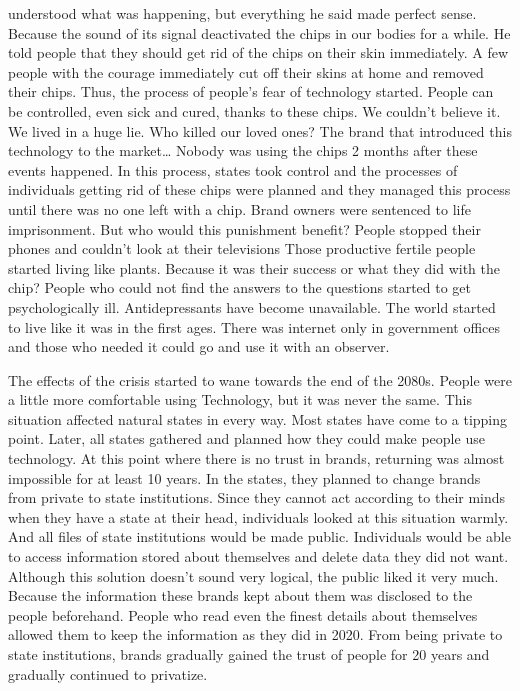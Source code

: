 \documentclass[]{book}
\begin{document}
understood what was happening, but everything he said made perfect sense. Because the sound of its signal deactivated the chips in our bodies for a while. He told people that they should get rid of the chips on their skin immediately. A few people with the courage immediately cut off their skins at home and removed their chips. Thus, the process of people's fear of technology started. People can be controlled, even sick and cured, thanks to these chips. We couldn't believe it. We lived in a huge lie. Who killed our loved ones? The brand that introduced this technology to the market\ldots{} Nobody was using the chips 2 months after these events happened. In this process, states took control and the processes of individuals getting rid of these chips were planned and they managed this process until there was no one left with a chip. Brand owners were sentenced to life imprisonment. But who would this punishment benefit? People stopped their phones and couldn't look at their televisions Those productive fertile people started living like plants. Because it was their success or what they did with the chip? People who could not find the answers to the questions started to get psychologically ill. Antidepressants have become unavailable. The world started to live like it was in the first ages. There was internet only in government offices and those who needed it could go and use it with an observer.

The effects of the crisis started to wane towards the end of the 2080s. People were a little more comfortable using Technology, but it was never the same. This situation affected natural states in every way. Most states have come to a tipping point. Later, all states gathered and planned how they could make people use technology. At this point where there is no trust in brands, returning was almost impossible for at least 10 years. In the states, they planned to change brands from private to state institutions. Since they cannot act according to their minds when they have a state at their head, individuals looked at this situation warmly. And all files of state institutions would be made public. Individuals would be able to access information stored about themselves and delete data they did not want. Although this solution doesn't sound very logical, the public liked it very much. Because the information these brands kept about them was disclosed to the people beforehand. People who read even the finest details about themselves allowed them to keep the information as they did in 2020. From being private to state institutions, brands gradually gained the trust of people for 20 years and gradually continued to privatize.
\end{document}

